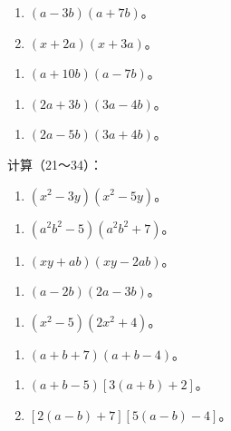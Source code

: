 \begin{enumerate}[start=12]
\item
  \((a - 3b)(a + 7b)\)。
\item
  \((x + 2a)(x + 3a)\)。
\end{enumerate}

\begin{enumerate}[start=15]
\item
  \((a + 10b)(a - 7b)\)。
\end{enumerate}

\begin{enumerate}[start=17]
\item
  \((2a + 3b)(3a - 4b)\)。
\end{enumerate}

\begin{enumerate}[start=19]
\item
  \((2a - 5b)(3a + 4b)\)。
\end{enumerate}

计算（21～34）：

\begin{enumerate}[start=21]
\item
  \((x^{2} - 3y)(x^{2} - 5y)\)。
\end{enumerate}

\begin{enumerate}[start=23]
\item
  \((a^2 b^2 - 5)(a^2 b^2 + 7)\)。
\end{enumerate}

\begin{enumerate}[start=25]
\item
  \((xy + ab)(xy - 2ab)\)。
\end{enumerate}

\begin{enumerate}[start=27]
\item
  \((a - 2b)(2a - 3b)\)。
\end{enumerate}

\begin{enumerate}[start=29]
\item
  \((x^{2} - 5)(2x^{2} + 4)\)。
\end{enumerate}

\begin{enumerate}[start=31]
\item
  \((a + b + 7)(a + b - 4)\)。
\end{enumerate}

\begin{enumerate}[start=33]
\item
  \((a + b - 5)[3(a + b) + 2]\)。
\item
  \([2(a - b) + 7][5(a - b) - 4]\)。
\end{enumerate}


